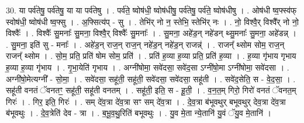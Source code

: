 \documentclass[17pt]{extarticle}
\begin{document}
30. या पर्व॑तेषु॒ पर्व॑तेषु॒ या या पर्व॑तेषु । . पर्व॑ते॒ ष्वोष॑धी॒ ष्वोष॑धीषु॒ पर्व॑तेषु॒ पर्व॑ते॒ ष्वोष॑धीषु । . ओष॑धी ष्व॒फ्स्व॑फ् स्वोष॑धी॒ ष्वोष॑धी ष्व॒फ्सु । . अ॒फ्सित्य॑प् - सु । . तेभि॑र् नो न॒ स्तेभि॒ स्तेभि॑र् नः । . नो॒ विश्वै॒र् विश्वै᳚र् नो नो॒ विश्वैः᳚ । . विश्वैः᳚ सु॒मनाः᳚ सु॒मना॒ विश्वै॒र् विश्वैः᳚ सु॒मनाः᳚ । . सु॒मना॒ अहे॑ड॒न् नहे॑डन् थ्सु॒मनाः᳚ सु॒मना॒ अहे॑डन्न् । . सु॒मना॒ इति॑ सु - मनाः᳚ । . अहे॑ड॒न् राज॒न् राज॒न् नहे॑ड॒न् नहे॑ड॒न् राजन्न्॑ । . राजन्᳚ थ्सोम सोम॒ राज॒न् राजन्᳚ थ्सोम । . सो॒म॒ प्रति॒ प्रति॑ षोम सोम॒ प्रति॑ । . प्रति॑ ह॒व्या ह॒व्या प्रति॒ प्रति॑ ह॒व्या । . ह॒व्या गृ॑भाय गृभाय ह॒व्या ह॒व्या गृ॑भाय । . गृ॒भा॒येति॑ गृभाय । . अग्नी॑षोमा॒ सवे॑दसा॒ सवे॑द॒सा ऽग्नी॑षो॒मा ऽग्नी॑षोमा॒ सवे॑दसा । . अग्नी॑षो॒मेत्यग्नी᳚ - सो॒मा॒ । . सवे॑दसा॒ सहू॑ती॒ सहू॑ती॒ सवे॑दसा॒ सवे॑दसा॒ सहू॑ती । . सवे॑द॒सेति॒ स - वे॒द॒सा॒ । . सहू॑ती वनतं ॅवनतꣳ॒॒ सहू॑ती॒ सहू॑ती वनतम् । . सहू॑ती॒ इति॒ स - हू॒ती॒ । . व॒न॒त॒म् गिरो॒ गिरो॑ वनतं ॅवनत॒म् गिरः॑ । . गिर॒ इति॒ गिरः॑ । . सम् दे॑व॒त्रा दे॑व॒त्रा सꣳ सम् दे॑व॒त्रा । . दे॒व॒त्रा ब॑भूवथुर् बभूवथुर् देव॒त्रा दे॑व॒त्रा ब॑भूवथुः । . दे॒व॒त्रेति॑ देव - त्रा । . ब॒भू॒व॒थु॒रिति॑ बभूवथुः । . यु॒व मे॒ता न्ये॒तानि॑ यु॒वं ॅयु॒व मे॒तानि॑ । \newline
\end{document}
